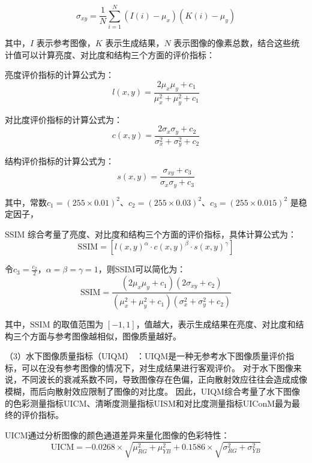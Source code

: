 \begin{equation}
    \sigma_{xy} = \frac{1}{N} \sum_{i=1}^{N} (I(i) - \mu_x)(K(i) - \mu_y)
\end{equation}

其中，$I$ 表示参考图像，$K$ 表示生成结果，$N$ 表示图像的像素总数，结合这些统计值可以计算亮度、对比度和结构三个方面的评价指标：

亮度评价指标的计算公式为：
\begin{equation}
    l(x, y) = \frac{2\mu_x\mu_y + c_1}{\mu_x^2 + \mu_y^2 + c_1}
\end{equation}

对比度评价指标的计算公式为：
\begin{equation}
    c(x, y) = \frac{2\sigma_x\sigma_y + c_2}{\sigma_x^2 + \sigma_y^2 + c_2}
\end{equation}

结构评价指标的计算公式为：
\begin{equation}
    s(x, y) = \frac{{\sigma_{xy} + c_3}}{{\sigma_x\sigma_y + c_3}}
\end{equation}

其中，常数$c_1=(255\times0.01)^2$、$c_2=(255\times0.03)^2$、$c_3=(255\times0.015)^2$ 是稳定因子，

SSIM 综合考量了亮度、对比度和结构三个方面的评价指标，具体计算公式为：
\begin{equation}
    \mathrm{SSIM} = [{{l(x,y)}^\alpha} \cdot {{c(x,y)}^\beta} \cdot {{s(x,y)}^\gamma} ]
\end{equation}

令$c_3=\frac{c_2}{2}$，$\alpha=\beta=\gamma=1$，则SSIM可以简化为：
\begin{equation}
    \mathrm{SSIM} = \frac{{(2\mu_x\mu_y + c_1)(2\sigma_{xy} + c_2)}}{{(\mu_x^2 + \mu_y^2 + c_1)(\sigma_x^2 + \sigma_y^2 + c_2)}}
\end{equation}

其中，$\mathrm{SSIM}$ 的取值范围为 $[-1, 1]$，值越大，表示生成结果在亮度、对比度和结构三个方面与参考图像越相似，图像质量越好。

（3）水下图像质量指标（UIQM） \cite{uiqm}：UIQM是一种无参考水下图像质量评价指标，可以在没有参考图像的情况下，对生成结果进行客观评价。
对于水下图像来说，不同波长的衰减系数不同，导致图像存在色偏，正向散射效应往往会造成成像模糊，而后向散射效应限制了图像的对比度。
因此，UIQM综合考量了水下图像的色彩测量指标$\mathrm{UICM}$、清晰度测量指标$\mathrm{UISM}$和对比度测量指标$\mathrm{UIConM}$最为最终的评价指标。

$\mathrm{UICM}$通过分析图像的颜色通道差异来量化图像的色彩特性：
\begin{equation}
    \mathrm{UICM}=-0.0268 \times \sqrt{\mu_{RG}^2 + \mu_{YB}^2} + 0.1586 \times \sqrt{\sigma_{RG}^2 + \sigma_{YB}^2}
\end{equation}

